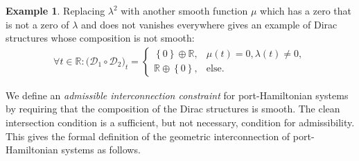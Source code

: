 \documentclass[preprint,12pt]{elsarticle}
\theoremstyle{definition}
\newtheorem{example}[theorem]{Example}
\newcommand{\set}[1]{\left\lbrace #1\right\rbrace}
\begin{document}
\begin{example}
Replacing $\lambda^2$ with another smooth function $\mu$ which has a zero that is not a zero of $\lambda$ and does not vanishes everywhere gives an example of Dirac structures whose composition is not smooth:
\begin{align*}
\forall t\in\mathbb{R}: \big(\mathcal{D}_{1}\circ\mathcal{D}_{2}\big)_t = \begin{cases}
\set{0}\oplus\mathbb{R}, & \mu(t) = 0, \lambda(t)\neq 0,\\
\mathbb{R}\oplus\set{0}, & \mathrm{else}.
\end{cases}
\end{align*}
\end{example}

We define an \textit{admissible interconnection constraint} for port-Hamiltonian systems by requiring that the composition of the Dirac structures is smooth. The clean intersection condition is a sufficient, but not necessary, condition for admissibility. This gives the formal definition of the geometric interconnection of port-Hamiltonian systems as follows.
\end{document}
